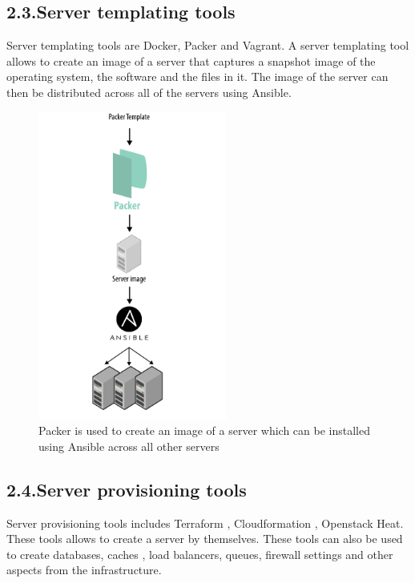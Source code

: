 \documentclass[9pt,twocolumn,twoside]{../../styles/osajnl}
\begin{document}
\subsection{2.3.Server templating tools}
Server templating tools are Docker, Packer and Vagrant. A server
templating tool allows to create an image of a server that captures a
snapshot image of the operating system, the software and the files in
it. The image of the server can then be distributed across all of the
servers using Ansible\cite{www-terraform-upandrunning}.


\begin{figure}[h]
  \begin{center}
 \includegraphics[width=\linewidth,height=4in]{images/packer}
 \caption{ Packer is used to create an image of a server which can be installed using Ansible across all other servers \cite{www-terraform-upandrunning}}
 \label{fig}
  \end{center}
\end{figure}

\subsection{2.4.Server provisioning tools}
Server provisioning tools includes Terraform , Cloudformation ,
Openstack Heat. These tools allows to create a server by
themselves. These tools can also be used to create databases, caches ,
load balancers, queues, firewall settings and other aspects from the
infrastructure\cite{www-terraform-upandrunning}.
\end{document}
